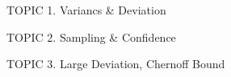 \documentclass[handout]{mcs}
\begin{document}
\renewcommand{\reading}{
Chapter~\bref{deviation_chap}{Deviation}
}

\begin{staffnotes}
TOPIC 1.  Variancs \& Deviation

TOPIC 2.  Sampling \& Confidence

TOPIC 3.  Large Deviation, Chernoff Bound

\end{staffnotes}

\end{document}
